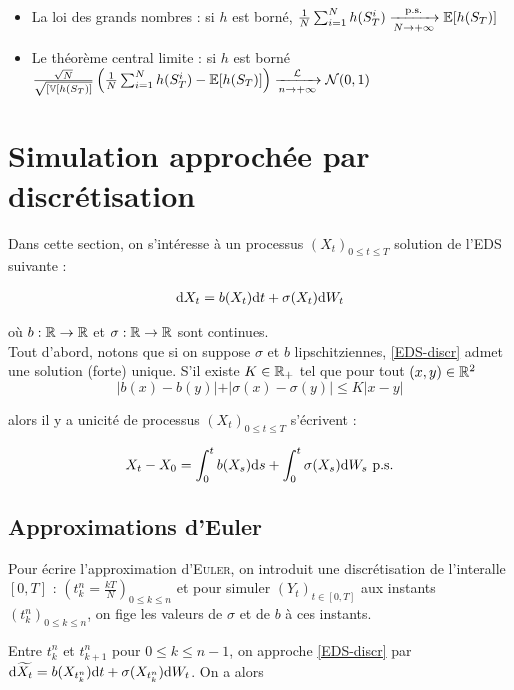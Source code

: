 \begin{itemize}
  \item La loi des grands nombres : si $h$ est borné, $ \frac{1}{N} \sum_{i=1}^{N} h(S_T^i) \xrightarrow[N\to +\infty]{\text{p.s.}} \mathbb{E}[h(S_T)]$
  \item Le théorème central limite : si $h$ est borné $ \frac{\sqrt{N}}{\sqrt{[\mathbb{V}[h(S_T)]}}\left( \frac{1}{N} \sum_{i=1}^{N} h(S_T^i) - \mathbb{E}[h(S_T)] \right) \xrightarrow[n\to +\infty]{\mathcal{L}} \mathcal{N}(0,1)$
\end{itemize}

\section{Simulation approchée par discrétisation}
Dans cette section, on s'intéresse à un processus $(X_t)_{0 \leq t \leq T}$ solution de l'EDS suivante :

\begin{equation}
  \label{EDS-discr}
\begin{split}
\mathrm{d} X_t = b(X_t) \mathrm{d} t + \sigma(X_t) \mathrm{d} W_t 
\end{split}
\end{equation}

où $b : \mathbb{R} \to \mathbb{R}$ et $\sigma : \mathbb{R} \to \mathbb{R}$ sont continues. \\

Tout d'abord, notons que si on suppose $\sigma$ et $b$ lipschitziennes, \eqref{EDS-discr} admet une solution (forte) unique. S'il existe $K \in \mathbb{R}_+$ tel que pour tout $(x,y) \in \mathbb{R}^2$
\[ \vert b(x) - b(y) \vert + \vert \sigma(x) - \sigma(y) \vert \leq K \vert x - y \vert \]

alors il y a unicité de processus $(X_t)_{0 \leq t \leq T}$ s'écrivent :

\[ X_t - X_0 = \int_{0}^{t} b(X_s) \mathrm{d} s + \int_{0}^{t} \sigma(X_s) \mathrm{d} W_s \text{ p.s.} \]

\subsection{Approximations d'Euler}

Pour écrire l'approximation d'\textsc{Euler}, on introduit une discrétisation de l'interalle $[0,T]$ : $\left( t_k^n = \frac{kT}{N} \right)_{0 \leq k \leq n}$ et pour simuler $(Y_t)_{t \in [0,T]}$ aux instants $(t_k^n)_{0 \leq k \leq n}$, on \og fige \fg{} les valeurs de $\sigma$ et de $b$ à ces instants.

Entre $t_k^n$ et $t_{k+1}^n$ pour $0 \leq k \leq n-1$, on approche \eqref{EDS-discr} par $\mathrm{d} \widetilde{X_t} = b(X_{t_k^n}) \mathrm{d} t + \sigma(X_{t_k^n}) \mathrm{d} W_t$. On a alors 

